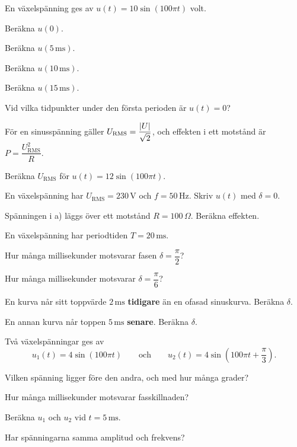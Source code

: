 En växelspänning ges av $u(t) = 10\sin(100\pi t)$ volt.
\begin{parts}
  \item Beräkna $u(0)$.
  \item Beräkna $u(5\,\text{ms})$.
  \item Beräkna $u(10\,\text{ms})$.
  \item Beräkna $u(15\,\text{ms})$.
  \item Vid vilka tidpunkter under den första perioden är $u(t) = 0$?
\end{parts}

För en sinusspänning gäller $U_{\text{RMS}} = \dfrac{\lvert U\rvert}{\sqrt{2}}$, och effekten i ett
motstånd är $P = \dfrac{U_{\text{RMS}}^2}{R}$.
\begin{parts}
  \item Beräkna $U_{\text{RMS}}$ för $u(t) = 12\sin(100\pi t)$.
  \item En växelspänning har $U_{\text{RMS}} = 230\,\text{V}$ och $f = 50\,\text{Hz}$. Skriv
    $u(t)$ med $\delta = 0$.
  \item Spänningen i a) läggs över ett motstånd $R = 100\,\Omega$. Beräkna effekten.
\end{parts}

En växelspänning har periodtiden $T = 20\,\text{ms}$.
\begin{parts}
  \item Hur många millisekunder motsvarar fasen $\delta = \dfrac{\pi}{2}$?
  \item Hur många millisekunder motsvarar $\delta = \dfrac{\pi}{6}$?
  \item En kurva når sitt toppvärde $2\,\text{ms}$ \textbf{tidigare} än en ofasad sinuskurva.
    Beräkna $\delta$.
  \item En annan kurva når toppen $5\,\text{ms}$ \textbf{senare}. Beräkna $\delta$.
\end{parts}

Två växelspänningar ges av
\[
  u_1(t) = 4\sin(100\pi t) \qquad \text{och} \qquad
  u_2(t) = 4\sin\left(100\pi t + \frac{\pi}{3}\right).
\]
\begin{parts}
  \item Vilken spänning ligger före den andra, och med hur många grader?
  \item Hur många millisekunder motsvarar fasskillnaden?
  \item Beräkna $u_1$ och $u_2$ vid $t = 5\,\text{ms}$.
  \item Har spänningarna samma amplitud och frekvens?
\end{parts}

